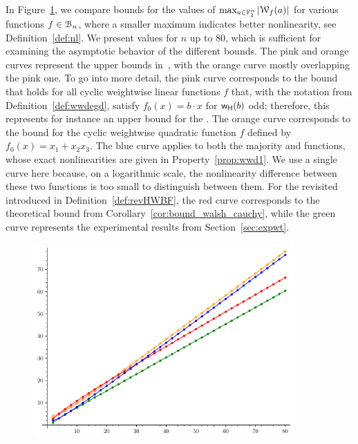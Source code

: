 \documentclass[11pt]{llncs}
\begin{document}
In Figure~\ref{fig:walsh_bound_comparison}, we compare bounds for the values of $\max_{a \in \mathbb{F}_2^n} |\mathcal W_{f}(a)|$ for various functions $f\in\mathcal{B}_n$, where a smaller maximum indicates better nonlinearity, see Definition~\ref{def:nl}.
We present values for $n$ up to $80$, which is sufficient for examining the asymptotic behavior of the different bounds.
The pink and orange curves represent the upper bounds  in~\cite{DAM:MeaOza24}, with the orange curve mostly overlapping the pink one. To go into more detail, the pink curve corresponds to the bound that holds for all cyclic weightwise linear functions $f$ that, with the notation from Definition~\ref{def:wwdegd}, satisfy $ f_0(x) = b \cdot x $ for $\mathsf{w_H}(b)$ odd; therefore, this represents for instance an upper bound for the \hwbf{}. The orange curve corresponds to the bound for the cyclic weightwise quadratic function $f$ defined by $f_0(x) = x_1 + x_2 x_3$.
The blue curve applies to both the majority and \hwbf{} functions, whose exact nonlinearities are given in Property~\ref{prop:wwd1}. We use a single curve here because, on a logarithmic scale, the nonlinearity difference between these two functions is too small to distinguish between them.
For the revisited \hwbf{} introduced in Definition~\ref{def:revHWBF}, the red curve corresponds to the theoretical bound from Corollary~\ref{cor:bound_walsh_cauchy}, while the green curve represents the experimental results from Section~\ref{sec:expwt}.

\begin{figure}[ht]
	\centering
	\includegraphics[width=10cm]{comparison_walsh_bound.pdf}
	\label{fig:walsh_bound_comparison}
\end{figure}
\end{document}
